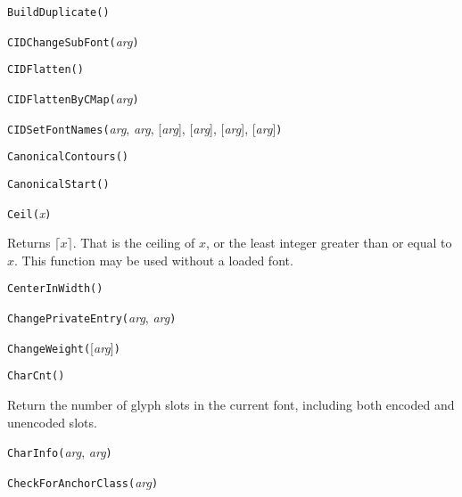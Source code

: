 \noindent\texttt{BuildDuplicate(}\texttt{)}


\noindent\texttt{CIDChangeSubFont(}\textit{arg}\texttt{)}


\noindent\texttt{CIDFlatten(}\texttt{)}


\noindent\texttt{CIDFlattenByCMap(}\textit{arg}\texttt{)}


\noindent\texttt{CIDSetFontNames(}\textit{arg}, \textit{arg}, [\textit{arg}], [\textit{arg}], [\textit{arg}], [\textit{arg}]\texttt{)}


\noindent\texttt{CanonicalContours(}\texttt{)}


\noindent\texttt{CanonicalStart(}\texttt{)}


\noindent\texttt{Ceil(}\textit{x}\texttt{)}

Returns $\lceil x \rceil$.  That is the ceiling of $x$, or the least
integer greater than or equal to $x$.  This function may be used without a
loaded font.


\noindent\texttt{CenterInWidth(}\texttt{)}


\noindent\texttt{ChangePrivateEntry(}\textit{arg}, \textit{arg}\texttt{)}


\noindent\texttt{ChangeWeight(}[\textit{arg}]\texttt{)}


\noindent\texttt{CharCnt()}

Return the number of glyph slots in the current font, including both encoded
and unencoded slots.


\noindent\texttt{CharInfo(}\textit{arg}, \textit{arg}\texttt{)}


\noindent\texttt{CheckForAnchorClass(}\textit{arg}\texttt{)}


